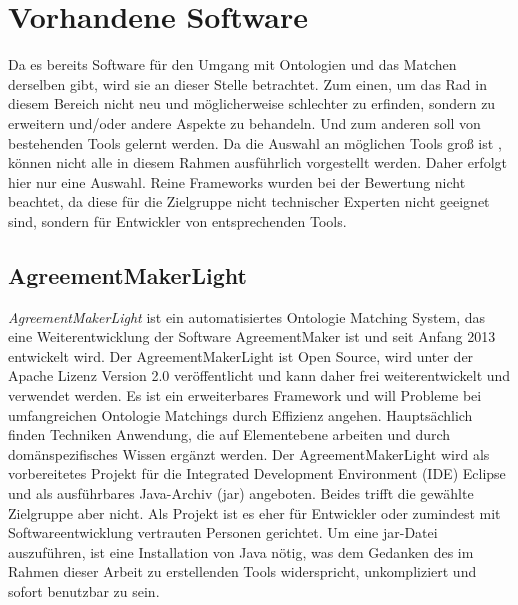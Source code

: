 		\section{Vorhandene Software}
		Da es bereits Software für den Umgang mit Ontologien und das Matchen derselben gibt, wird sie an dieser Stelle betrachtet. Zum einen, um das Rad in diesem Bereich nicht neu und möglicherweise schlechter zu erfinden, sondern zu erweitern und/oder andere Aspekte zu behandeln. Und zum anderen soll von bestehenden Tools gelernt werden. Da die Auswahl an möglichen Tools groß ist \cite{Ber14} , können nicht alle in diesem Rahmen ausführlich vorgestellt werden. Daher erfolgt hier nur eine Auswahl. Reine Frameworks wurden bei der Bewertung nicht beachtet, da diese für die Zielgruppe nicht technischer Experten nicht geeignet sind, sondern für Entwickler von entsprechenden Tools.
		
		\subsection{AgreementMakerLight}
		\textit{AgreementMakerLight} ist ein automatisiertes Ontologie Matching System,
		das eine Weiterentwicklung der Software AgreementMaker ist und seit Anfang 2013 entwickelt wird. Der AgreementMakerLight ist Open Source, wird unter der Apache Lizenz Version 2.0 veröffentlicht und kann daher frei weiterentwickelt und verwendet werden. Es ist ein erweiterbares Framework und will Probleme bei umfangreichen Ontologie Matchings durch Effizienz angehen. Hauptsächlich finden Techniken Anwendung, die auf Elementebene arbeiten und durch domänspezifisches Wissen ergänzt werden.
		Der AgreementMakerLight wird als vorbereitetes Projekt für die Integrated
		Development Environment (IDE) Eclipse und als ausführbares Java-Archiv (jar) angeboten. Beides trifft die gewählte Zielgruppe aber nicht. Als Projekt ist es eher für Entwickler oder zumindest mit Softwareentwicklung vertrauten Personen gerichtet. Um eine jar-Datei auszuführen, ist eine Installation von Java nötig, was dem Gedanken des im Rahmen dieser Arbeit zu erstellenden Tools widerspricht, unkompliziert und sofort benutzbar zu sein.
		
